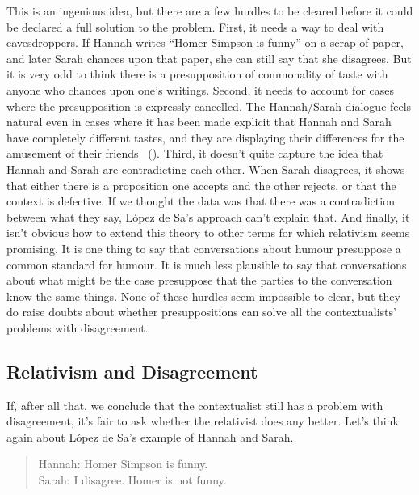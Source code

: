 \documentclass[
  10pt,
  letterpaper,
  DIV=11,
  numbers=noendperiod,
  twoside]{scrartcl}
\begin{document}
This is an ingenious idea, but there are a few hurdles to be cleared
before it could be declared a full solution to the problem. First, it
needs a way to deal with eavesdroppers. If Hannah writes ``Homer Simpson
is funny'' on a scrap of paper, and later Sarah chances upon that paper,
she can still say that she disagrees. But it is very odd to think there
is a presupposition of commonality of taste with anyone who chances upon
one's writings. Second, it needs to account for cases where the
presupposition is expressly cancelled. The Hannah/Sarah dialogue feels
natural even in cases where it has been made explicit that Hannah and
Sarah have completely different tastes, and they are displaying their
differences for the amusement of their friends
~(). Third, it
doesn't quite capture the idea that Hannah and Sarah are contradicting
each other. When Sarah disagrees, it shows that either there is a
proposition one accepts and the other rejects, or that the context is
defective. If we thought the data was that there was a contradiction
between what they say, López de Sa's approach can't explain that. And
finally, it isn't obvious how to extend this theory to other terms for
which relativism seems promising. It is one thing to say that
conversations about humour presuppose a common standard for humour. It
is much less plausible to say that conversations about what might be the
case presuppose that the parties to the conversation know the same
things. None of these hurdles seem impossible to clear, but they do
raise doubts about whether presuppositions can solve all the
contextualists' problems with disagreement.

\subsection{Relativism and
Disagreement}\label{relativismanddisagreement}

If, after all that, we conclude that the contextualist still has a
problem with disagreement, it's fair to ask whether the relativist does
any better. Let's think again about López de Sa's example of Hannah and
Sarah.

\begin{quote}
Hannah: Homer Simpson is funny.\\
Sarah: I disagree. Homer is not funny.
\end{quote}
\end{document}
